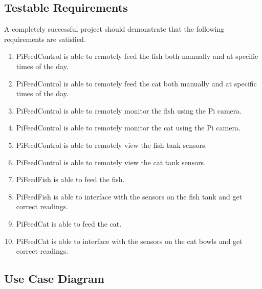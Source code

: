 \subsection{Testable Requirements}
A completely successful project should demonstrate that the following requirements
are satisfied.
\begin{enumerate}
    \item PiFeedControl is able to remotely feed the fish both manually and at
          specific times of the day.
    \item PiFeedControl is able to remotely feed the cat both manually and at
          specific times of the day.
    \item PiFeedControl is able to remotely monitor the fish using the Pi camera.
    \item PiFeedControl is able to remotely monitor the cat using the Pi camera.
    \item PiFeedControl is able to remotely view the fish tank sensors.
    \item PiFeedControl is able to remotely view the cat tank sensors.
    \item PiFeedFish is able to feed the fish.
    \item PiFeedFish is able to interface with the sensors on the fish tank and
          get correct readings.
    \item PiFeedCat is able to feed the cat.
    \item PiFeedCat is able to interface with the sensors on the cat bowls and
          get correct readings.
\end{enumerate}

\subsection{Use Case Diagram}

